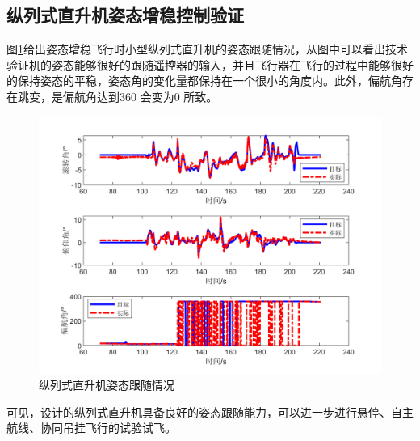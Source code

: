 \subsection{纵列式直升机姿态增稳控制验证}
图\ref{fig:chap7:ATT}给出姿态增稳飞行时小型纵列式直升机的姿态跟随情况，从图中可以看出技术验证机的姿态能够很好的跟随遥控器的输入，并且飞行器在飞行的过程中能够很好的保持姿态的平稳，姿态角的变化量都保持在一个很小的角度内。此外，偏航角存在跳变，是偏航角达到360 \degree 会变为0 \degree 所致。
\begin{figure}[htb!]
    \centering
    \includegraphics[width = 14cm]{fig/figure_chap7/ATT.png}
    \caption{纵列式直升机姿态跟随情况\label{fig:chap7:ATT}}
\end{figure}

可见，设计的纵列式直升机具备良好的姿态跟随能力，可以进一步进行悬停、自主航线、协同吊挂飞行的试验试飞。
